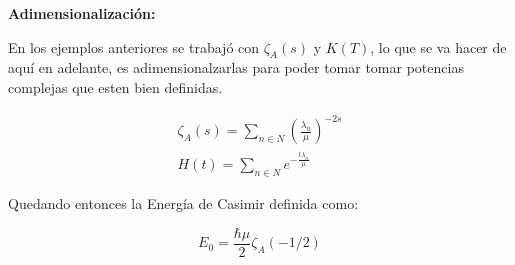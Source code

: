\textbf{Adimensionalización:\\}


En los ejemplos anteriores se trabajó con  $\zeta _A (s) $ y $K(T)$, lo que se va hacer de aquí en adelante, es adimensionalzarlas para poder tomar tomar potencias complejas que esten bien definidas.


\begin{equation}
\begin{array}{c}


\zeta _A (s) = \sum _{n \in N} \left( \frac{\lambda _n}{\mu }  \right) ^{-2s } \\[10pt]

H (t)  = \sum \limits_{n \in N} e ^{- \frac{t \lambda _{n}}{\mu} }

\end{array}
\end{equation}

Quedando entonces la Energía de Casimir definida como:

\begin{equation}
E _0 = \frac{\hbar \mu}{2} \zeta _A (-1/2)
\end{equation}